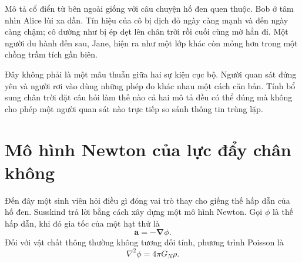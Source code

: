 Mô tả cổ điển từ bên ngoài giống với câu chuyện hố đen quen thuộc. Bob ở tâm nhìn Alice lùi xa dần. Tín hiệu của cô bị dịch đỏ ngày càng mạnh và đến ngày càng chậm; cô dường như bị ép dẹt lên chân trời rồi cuối cùng mờ hẳn đi. Một người du hành đến sau, Jane, hiện ra như một lớp khác còn mỏng hơn trong một chồng trầm tích gần biên.

\begin{classroomqa}
\end{classroomqa}

\begin{classroomqa}
\end{classroomqa}

Đây không phải là một mâu thuẫn giữa hai sự kiện cục bộ. Người quan sát đứng yên và người rơi vào dùng những phép đo khác nhau một cách căn bản. Tính bổ sung chân trời đặt câu hỏi làm thế nào cả hai mô tả đều có thể đúng mà không cho phép một người quan sát nào trực tiếp so sánh thông tin trùng lặp.

\section{Mô hình Newton của lực đẩy chân không}

Đến đây một sinh viên hỏi điều gì đóng vai trò thay cho giếng thế hấp dẫn của hố đen. Susskind trả lời bằng cách xây dựng một mô hình Newton. Gọi \(\phi\) là thế hấp dẫn, khi đó gia tốc của một hạt thử là
\begin{equation}
\mathbf{a}=-\boldsymbol{\nabla}\phi.
\end{equation}
Đối với vật chất thông thường không tương đối tính, phương trình Poisson là
\begin{equation}
\nabla^2\phi=4\pi G_N\rho.
\label{eq:l09-poisson}
\end{equation}

